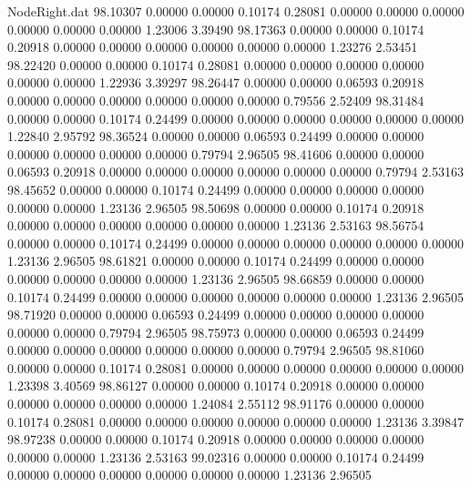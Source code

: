 \begin{filecontents}{NodeRight.dat}
  98.10307    0.00000    0.00000     0.10174    0.28081    0.00000    0.00000    0.00000    0.00000    0.00000    0.00000    1.23006    3.39490
  98.17363    0.00000    0.00000     0.10174    0.20918    0.00000    0.00000    0.00000    0.00000    0.00000    0.00000    1.23276    2.53451
  98.22420    0.00000    0.00000     0.10174    0.28081    0.00000    0.00000    0.00000    0.00000    0.00000    0.00000    1.22936    3.39297
  98.26447    0.00000    0.00000     0.06593    0.20918    0.00000    0.00000    0.00000    0.00000    0.00000    0.00000    0.79556    2.52409
  98.31484    0.00000    0.00000     0.10174    0.24499    0.00000    0.00000    0.00000    0.00000    0.00000    0.00000    1.22840    2.95792
  98.36524    0.00000    0.00000     0.06593    0.24499    0.00000    0.00000    0.00000    0.00000    0.00000    0.00000    0.79794    2.96505
  98.41606    0.00000    0.00000     0.06593    0.20918    0.00000    0.00000    0.00000    0.00000    0.00000    0.00000    0.79794    2.53163
  98.45652    0.00000    0.00000     0.10174    0.24499    0.00000    0.00000    0.00000    0.00000    0.00000    0.00000    1.23136    2.96505
  98.50698    0.00000    0.00000     0.10174    0.20918    0.00000    0.00000    0.00000    0.00000    0.00000    0.00000    1.23136    2.53163
  98.56754    0.00000    0.00000     0.10174    0.24499    0.00000    0.00000    0.00000    0.00000    0.00000    0.00000    1.23136    2.96505
  98.61821    0.00000    0.00000     0.10174    0.24499    0.00000    0.00000    0.00000    0.00000    0.00000    0.00000    1.23136    2.96505
  98.66859    0.00000    0.00000     0.10174    0.24499    0.00000    0.00000    0.00000    0.00000    0.00000    0.00000    1.23136    2.96505
  98.71920    0.00000    0.00000     0.06593    0.24499    0.00000    0.00000    0.00000    0.00000    0.00000    0.00000    0.79794    2.96505
  98.75973    0.00000    0.00000     0.06593    0.24499    0.00000    0.00000    0.00000    0.00000    0.00000    0.00000    0.79794    2.96505
  98.81060    0.00000    0.00000     0.10174    0.28081    0.00000    0.00000    0.00000    0.00000    0.00000    0.00000    1.23398    3.40569
  98.86127    0.00000    0.00000     0.10174    0.20918    0.00000    0.00000    0.00000    0.00000    0.00000    0.00000    1.24084    2.55112
  98.91176    0.00000    0.00000     0.10174    0.28081    0.00000    0.00000    0.00000    0.00000    0.00000    0.00000    1.23136    3.39847
  98.97238    0.00000    0.00000     0.10174    0.20918    0.00000    0.00000    0.00000    0.00000    0.00000    0.00000    1.23136    2.53163
  99.02316    0.00000    0.00000     0.10174    0.24499    0.00000    0.00000    0.00000    0.00000    0.00000    0.00000    1.23136    2.96505

\end{filecontents}
